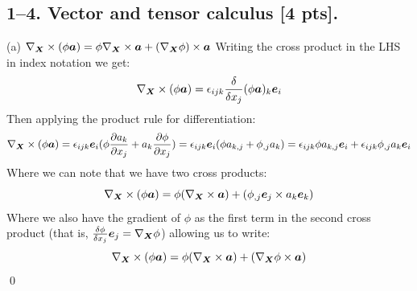 \newpage
\subsection*{1--4. \textbf{Vector and tensor calculus} [4 pts].}

\medskip
(a) $\nabla_{\bm{X}} \times (\phi \bm{a}) = \phi \nabla_{\bm{X}} \times \bm{a} + (\nabla_{\bm{X}}\phi) \times \bm{a}$ \newline
Writing the cross product in the LHS in index notation we get:
\begin{equation}
    \nabla_{\bm{X}} \times (\phi \bm{a}) = \epsilon_{ijk} \frac{\delta}{\delta x_j}(\phi \bm{a})_k\bm{e}_i
\end{equation}
Then applying the product rule for differentiation:
\begin{equation}
   \nabla_{\bm{X}} \times (\phi \bm{a}) = \epsilon_{ijk}\bm{e}_i (\phi \frac{\partial a_k}{\partial x_j} + a_k \frac{\partial \phi}{\partial x_j}) = \epsilon_{ijk}\bm{e}_i (\phi a_{k,j} + \phi_{,j}a_k) = \epsilon_{ijk}\phi a_{k,j}\bm{e}_i + \epsilon_{ijk}\phi_{,j}a_k\bm{e}_i
\end{equation}
Where we can note that we have two cross products:
\begin{equation}
   \nabla_{\bm{X}} \times (\phi \bm{a}) = \phi(\nabla_{\bm{X}} \times \bm{a}) + (\phi_{,j}\bm{e}_j \times a_k\bm{e}_k)
\end{equation}
Where we also have the gradient of $\phi$ as the first term in the second cross product (that is, $\frac{\delta \phi}{\delta x_j}\bm{e}_j = \nabla_{\bm{X}} \phi$) allowing us to write:
\begin{equation}
   \nabla_{\bm{X}} \times (\phi \bm{a}) = \phi(\nabla_{\bm{X}} \times \bm{a}) + (\nabla_{\bm{X}} \phi \times \bm{a})
\end{equation} \qed


